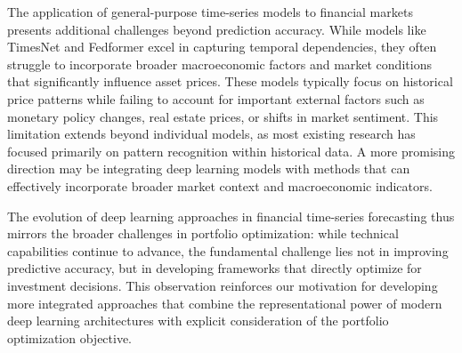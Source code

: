The application of general-purpose time-series models to financial markets presents additional challenges beyond prediction accuracy. While models like TimesNet \citep{wu2023timesnet} and Fedformer \citep{zhou2022fedformer} excel in capturing temporal dependencies, they often struggle to incorporate broader macroeconomic factors and market conditions that significantly influence asset prices. These models typically focus on historical price patterns while failing to account for important external factors such as monetary policy changes, real estate prices, or shifts in market sentiment. This limitation extends beyond individual models, as most existing research has focused primarily on pattern recognition within historical data. A more promising direction may be integrating deep learning models with methods that can effectively incorporate broader market context and macroeconomic indicators.

The evolution of deep learning approaches in financial time-series forecasting thus mirrors the broader challenges in portfolio optimization: while technical capabilities continue to advance, the fundamental challenge lies not in improving predictive accuracy, but in developing frameworks that directly optimize for investment decisions. This observation reinforces our motivation for developing more integrated approaches that combine the representational power of modern deep learning architectures with explicit consideration of the portfolio optimization objective.
